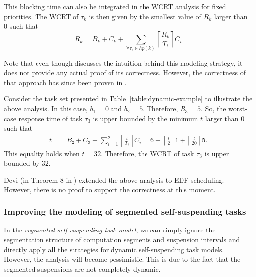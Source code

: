 This blocking time can also be integrated in the WCRT analysis for fixed priorities. The WCRT of $\tau_k$ is then given by the smallest value of $R_k$ larger than $0$ such that
\begin{equation*}
R_k = B_k + C_k + \sum_{\forall \tau_i \in hp(k)} \left\lceil \frac{R_k}{T_i} \right\rceil C_i
\end{equation*}


Note that even though \cite{Liu:2000:RS:518501} discusses the intuition behind this modeling strategy, it does not provide any actual proof of its correctness. 
However, the correctness of that approach has since been proven in \cite{ChenHuangNelissen}. 

\begin{example}
\label{ex:suspension-blocking}    
Consider the task set presented in Table~\ref{table:dynamic-example} to illustrate the above analysis. In this case, $b_1 = 0$ and $b_2 = 5$. Therefore, $B_3 = 5$. So, the worst-case response time of task $\tau_3$ is upper bounded by the minimum $t$ larger than $0$ such that 
\begin{align*}
t & = B_3+C_3+\sum_{i=1}^2 \left\lceil \frac{t}{T_i} \right\rceil C_i = 6+\left\lceil \frac{t}{2} \right\rceil 1 +\left\lceil \frac{t}{20} \right\rceil 5.
\end{align*} 
This equality holds when $t=32$. Therefore, the WCRT of task $\tau_{3}$ is upper bounded by $32$.
\hfill\myendproof  
\end{example}



Devi (in Theorem 8 in \cite[Section 4.5]{DBLP:conf/ecrts/Devi03}) extended the above analysis to
EDF scheduling. However, there is no proof to support the correctness at this moment.



\subsubsection{Improving the modeling of segmented self-suspending tasks}
\label{sec:model-interfering-improving}

In the \emph{segmented self-suspending task model}, we can simply ignore the segmentation structure of computation segments and suspension intervals 
and directly apply all the strategies for dynamic self-suspending task models. However, the analysis will become pessimistic. This is due to the fact 
that the segmented suspensions are not completely dynamic. 

